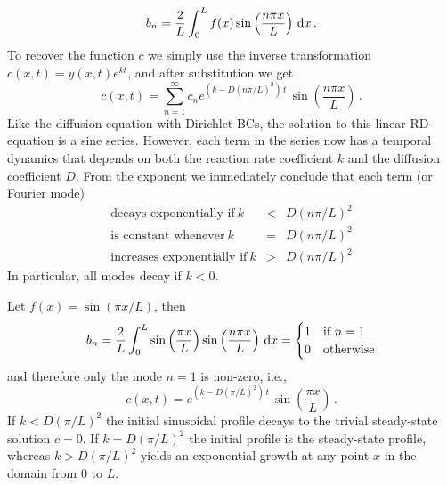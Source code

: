 \begin{equation}
	b_n = \frac{2}{L} \int_0^L f(x)    \sin\left(\frac{n\pi x}{L} \right) \, \mathrm{d} x \, .
\end{equation}
To recover the function $c$ we simply use the inverse transformation $c(x,t)=y(x,t)e^{k t}$, 
and after substitution we get
\begin{equation}
  c(x,t) = \sum_{n=1}^\infty c_n e^{\left(k -D\left(n\pi/L\right)^2 \right)\, t} \,
	\sin\left(\frac{n\pi x}{L} \right) \, .
\end{equation}
Like the diffusion equation with Dirichlet BCs, the solution to this linear RD-equation is
a sine series. However, each term in the series now has a temporal dynamics that 
depends on both the reaction rate coefficient $k$  and the diffusion coefficient $D$. 
From the exponent we immediately conclude that each term (or Fourier mode)
\begin{eqnarray}
  \label{eq:linstablcriterion}
  \text{decays exponentially if} \ k &<& D\left(n\pi/L\right)^2 \nonumber \\
  \text{is constant whenever} \ k &=& D\left(n\pi/L\right)^2 \nonumber \\
  \text{increases exponentially if} \ k &>& D\left(n\pi/L\right)^2 
\end{eqnarray}
In particular, all modes decay if $k<0$. 

\begin{example} \label{example:linearonemode}
  Let $f(x) = \sin(\pi x/L)$, then
  \begin{equation}
	  b_n = \frac{2}{L} \int_0^L \sin\left(\frac{\pi x}{L}\right)  \sin\left(\frac{n\pi x}{L}
	  \right) \, \mathrm{d} x = 
    \begin{cases}
      1 & \text{if } n=1 \\
      0 & \text{otherwise}
    \end{cases}
  \end{equation}
  and therefore only the mode $n=1$ is non-zero, i.e., 
  \begin{equation}
    c(x,t)= e^{\left(k -D\left(\pi/L\right)^2 \right)\, t} \,
	  \sin\left(\frac{\pi x}{L} \right) \, .
  \end{equation}
  If $k< D\left(\pi/L\right)^2$ the initial sinusoidal profile decays to the
  trivial steady-state solution $c=0$. If $k = D\left(\pi/L\right)^2$ the initial
  profile is the steady-state profile, whereas $k>D\left(\pi/L\right)^2$ yields
  an exponential growth at any point $x$ in the domain from 0 to $L$.
\end{example}


